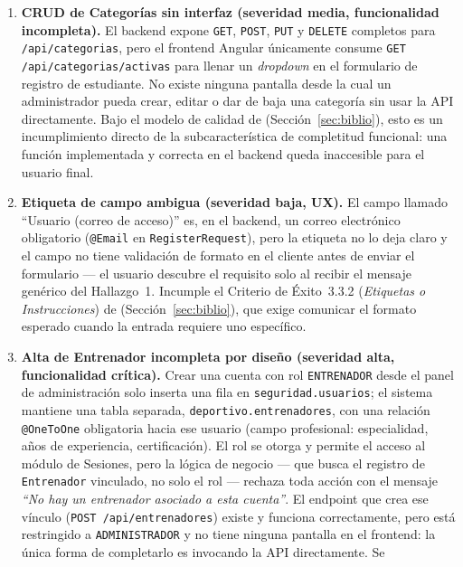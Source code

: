\documentclass[12pt,a4paper]{article}
\begin{document}
\begin{enumerate}
    corregido contra base de datos real, no mocks (ver Sección~\ref{sec:mvc}).
  \item \textbf{CRUD de Categorías sin interfaz (severidad media, funcionalidad incompleta).}
    El backend expone \texttt{GET}, \texttt{POST}, \texttt{PUT} y \texttt{DELETE} completos
    para \texttt{/api/categorias}, pero el frontend Angular únicamente consume
    \texttt{GET /api/categorias/activas} para llenar un \textit{dropdown} en el formulario de
    registro de estudiante. No existe ninguna pantalla desde la cual un administrador pueda
    crear, editar o dar de baja una categoría sin usar la API directamente. Bajo el modelo de
    calidad de \textcite{iso25010} (Sección~\ref{sec:biblio}), esto es un incumplimiento
    directo de la subcaracterística de completitud funcional: una función implementada y
    correcta en el backend queda inaccesible para el usuario final.
  \item \textbf{Etiqueta de campo ambigua (severidad baja, UX).} El campo llamado
    ``Usuario (correo de acceso)'' es, en el backend, un correo electrónico obligatorio
    (\texttt{@Email} en \texttt{RegisterRequest}), pero la etiqueta no lo deja claro y el
    campo no tiene validación de formato en el cliente antes de enviar el formulario --- el
    usuario descubre el requisito solo al recibir el mensaje genérico del Hallazgo~1.
    Incumple el Criterio de Éxito~3.3.2 (\textit{Etiquetas o Instrucciones}) de
    \textcite{wcag22} (Sección~\ref{sec:biblio}), que exige comunicar el formato esperado
    cuando la entrada requiere uno específico.
  \item \textbf{Alta de Entrenador incompleta por diseño (severidad alta, funcionalidad
    crítica).} Crear una cuenta con rol \texttt{ENTRENADOR} desde el panel de administración
    solo inserta una fila en \texttt{seguridad.usuarios}; el sistema mantiene una tabla
    separada, \texttt{deportivo.entrenadores}, con una relación \texttt{@OneToOne} obligatoria
    hacia ese usuario (campo profesional: especialidad, años de experiencia, certificación).
    El rol se otorga y permite el acceso al módulo de Sesiones, pero la lógica de negocio
    --- que busca el registro de \texttt{Entrenador} vinculado, no solo el rol --- rechaza
    toda acción con el mensaje \textit{``No hay un entrenador asociado a esta cuenta''}. El
    endpoint que crea ese vínculo (\texttt{POST /api/entrenadores}) existe y funciona
    correctamente, pero está restringido a \texttt{ADMINISTRADOR} y no tiene ninguna pantalla
    en el frontend: la única forma de completarlo es invocando la API directamente. Se

\end{enumerate}
\end{document}
